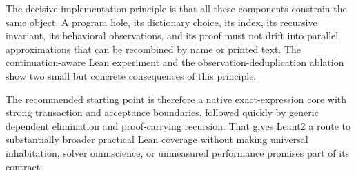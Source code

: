 The decisive implementation principle is that all these components constrain
the same object. A program hole, its dictionary choice, its index, its recursive
invariant, its behavioral observations, and its proof must not drift into
parallel approximations that can be recombined by name or printed text. The
continuation-aware Lean experiment and the observation-deduplication ablation
show two small but concrete consequences of this principle.

The recommended starting point is therefore a native exact-expression core
with strong transaction and acceptance boundaries, followed quickly by generic
dependent elimination and proof-carrying recursion. That gives Leant2 a route
to substantially broader practical Lean coverage without making universal
inhabitation, solver omniscience, or unmeasured performance promises part of its
contract.
